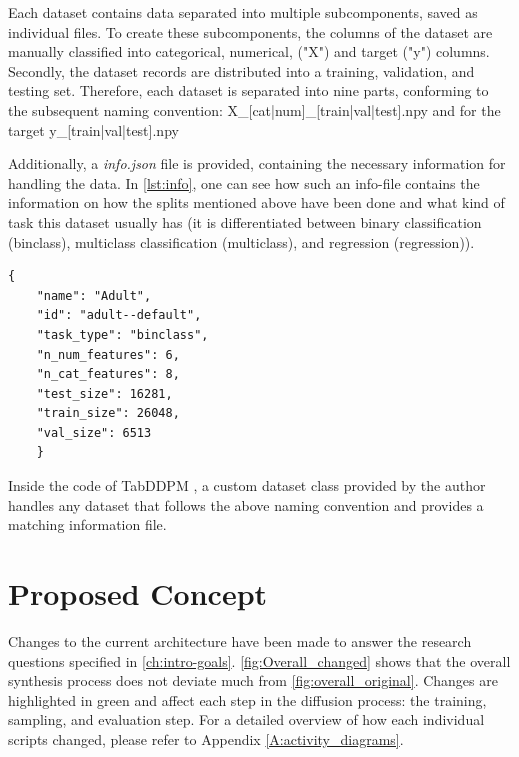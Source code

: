 Each dataset contains data separated into multiple subcomponents, saved as individual files.
To create these subcomponents, the columns of the dataset are manually classified into categorical, numerical, ("X") and target ("y") columns.
Secondly, the dataset records are distributed into a training, validation, and testing set.
Therefore, each dataset is separated into nine parts, conforming to the subsequent naming convention:
X\_[cat|num]\_[train|val|test].npy and for the target y\_[train|val|test].npy

Additionally, a \textit{info.json} file is provided, containing the necessary information for handling the data.
In \autoref{lst:info}, one can see how such an info-file contains the information on how the splits mentioned above have been done and what kind of task this dataset usually has (it is differentiated between binary classification (binclass), multiclass classification (multiclass), and regression (regression)).
\begin{lstlisting}[label={lst:info},caption={Example Data-info File}]
    {
    "name": "Adult",
    "id": "adult--default",
    "task_type": "binclass",
    "n_num_features": 6,
    "n_cat_features": 8,
    "test_size": 16281,
    "train_size": 26048,
    "val_size": 6513
    }
\end{lstlisting}
Inside the code of TabDDPM \cite{akim2023TabDDPMModellingTabular}, a custom dataset class provided by the author handles any dataset that follows the above naming convention and provides a matching information file.

\section{Proposed Concept}
\label{ch:conceptualDesign-changes}

Changes to the current architecture have been made to answer the research questions specified in \autoref{ch:intro-goals}.
\autoref{fig:Overall_changed} shows that the overall synthesis process does not deviate much from \autoref{fig:overall_original}.
Changes are highlighted in green and affect each step in the diffusion process: the training, sampling, and evaluation step.
For a detailed overview of how each individual scripts changed, please refer to Appendix \ref{A:activity_diagrams}.

